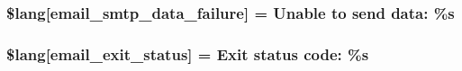 \subsubsection[{\$lang}]{\setlength{\rightskip}{0pt plus 5cm}\$lang\mbox{[}\textquotesingle{}email\+\_\+smtp\+\_\+data\+\_\+failure\textquotesingle{}\mbox{]} = \textquotesingle{}Unable to send data\+: \%s\textquotesingle{}}\label{_admin_2system_2language_2english_2email__lang_8php_a59801e23c2d745400384098c7bf0a6dc}
\hypertarget{_admin_2system_2language_2english_2email__lang_8php_a32b0c2f50acd03defc88df937ee2877f}{}
\subsubsection[{\$lang}]{\setlength{\rightskip}{0pt plus 5cm}\$lang\mbox{[}\textquotesingle{}email\+\_\+exit\+\_\+status\textquotesingle{}\mbox{]} = \textquotesingle{}Exit status code\+: \%s\textquotesingle{}}\label{_admin_2system_2language_2english_2email__lang_8php_a32b0c2f50acd03defc88df937ee2877f}
